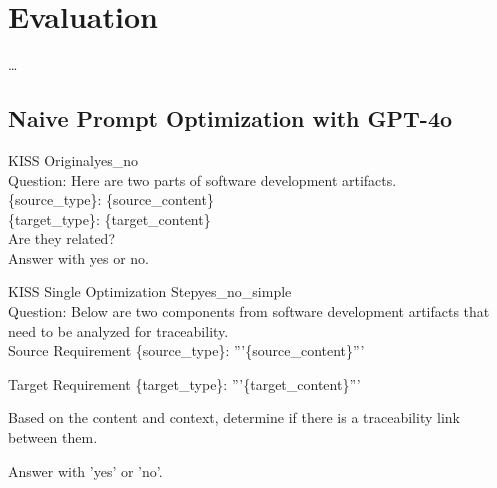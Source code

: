 
\chapter{Evaluation}
\label{ch:Evaluation}

\dots

\section{Naive Prompt Optimization with GPT-4o}
\label{sec:Evaluation:FirstSection}

\begin{prompt}{KISS Original}{yes_no}\\
    Question: Here are two parts of software development artifacts.\\
    \{source\_type\}: \textquotesingle{}\textquotesingle{}\textquotesingle{}\{source\_content\}\textquotesingle{}\textquotesingle{}\textquotesingle{}\\
    \{target\_type\}: \textquotesingle{}\textquotesingle{}\textquotesingle{}\{target\_content\}\textquotesingle{}\textquotesingle{}\textquotesingle{}\\
    Are they related?\\
    Answer with \textquotesingle{}yes\textquotesingle{} or \textquotesingle{}no\textquotesingle{}.
\end{prompt}

\begin{prompt}{KISS Single Optimization Step}{yes_no_simple}\\
    Question: Below are two components from software development artifacts that need to be analyzed for traceability.\\

            Source Requirement \{source\_type\}: '''\{source\_content\}'''

            Target Requirement \{target\_type\}: '''\{target\_content\}'''
            
            Based on the content and context, determine if there is a traceability link between them.

            Answer with 'yes' or 'no'.
    
\end{prompt}

